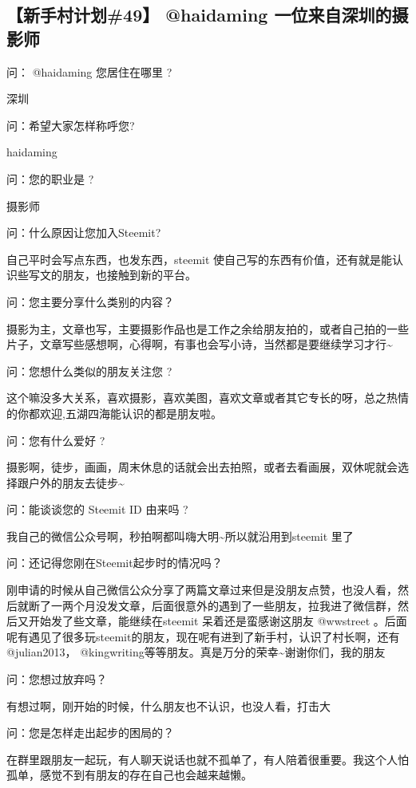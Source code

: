 \documentclass[]{ctexbook}
\begin{document}
\hypertarget{49-haidaming-}{%
\subsection{【新手村计划\#49】 @haidaming 一位来自深圳的摄影师}\label{49-haidaming-}}

问： @haidaming 您居住在哪里 ?

深圳

问：希望大家怎样称呼您?

haidaming

问：您的职业是 ?

摄影师

问：什么原因让您加入Steemit?

自己平时会写点东西，也发东西，steemit 使自己写的东西有价值，还有就是能认识些写文的朋友，也接触到新的平台。

问：您主要分享什么类别的内容？

摄影为主，文章也写，主要摄影作品也是工作之余给朋友拍的，或者自己拍的一些片子，文章写些感想啊，心得啊，有事也会写小诗，当然都是要继续学习才行\textasciitilde{}

问：您想什么类似的朋友关注您 ?

这个嘛没多大关系，喜欢摄影，喜欢美图，喜欢文章或者其它专长的呀，总之热情的你都欢迎,五湖四海能认识的都是朋友啦。

问：您有什么爱好 ?

摄影啊，徒步，画画，周末休息的话就会出去拍照，或者去看画展，双休呢就会选择跟户外的朋友去徒步\textasciitilde{}

问：能谈谈您的 Steemit ID 由来吗 ?

我自己的微信公众号啊，秒拍啊都叫嗨大明\textasciitilde{}所以就沿用到steemit 里了

问：还记得您刚在Steemit起步时的情况吗？

刚申请的时候从自己微信公众分享了两篇文章过来但是没朋友点赞，也没人看，然后就断了一两个月没发文章，后面很意外的遇到了一些朋友，拉我进了微信群，然后又开始发了些文章，能继续在steemit 呆着还是蛮感谢这朋友 @wwstreet 。后面呢有遇见了很多玩steemit的朋友，现在呢有进到了新手村，认识了村长啊，还有 @julian2013， @kingwriting等等朋友。真是万分的荣幸\textasciitilde{}谢谢你们，我的朋友

问：您想过放弃吗？

有想过啊，刚开始的时候，什么朋友也不认识，也没人看，打击大

问：您是怎样走出起步的困局的？

在群里跟朋友一起玩，有人聊天说话也就不孤单了，有人陪着很重要。我这个人怕孤单，感觉不到有朋友的存在自己也会越来越懒。
\end{document}
